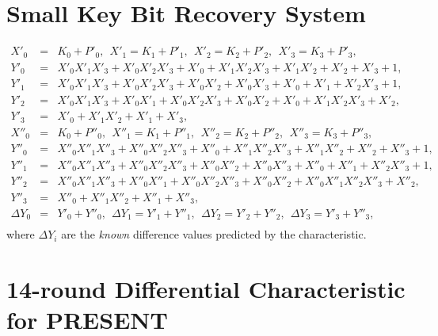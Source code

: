\documentclass{llncs}
\begin{document}
\section{Small Key Bit Recovery System}
\label{app:small-equ}
\begin{eqnarray*}
X'_0 &=& K_0 + P'_0, \ \ X'_1 = K_1 + P'_1, \ \ X'_2 = K_2 + P'_2, \ \ X'_3 =
K_3 +
P'_3,\\
Y'_0 &=& X'_0X'_1X'_3 + X'_0X'_2X'_3 + X'_0 + X'_1X'_2X'_3 + X'_1X'_2 +
X'_2 + X'_3 + 1,\\
Y'_1 &=& X'_0X'_1X'_3 + X'_0X'_2X'_3 + X'_0X'_2 + X'_0X'_3 + X'_0 + X'_1 +
X'_2X'_3 + 1,\\
Y'_2 &=& X'_0X'_1X'_3 + X'_0X'_1 + X'_0X'_2X'_3 + X'_0X'_2 + X'_0 +
X'_1X'_2X'_3 + X'_2,\\
Y'_3 &=& X'_0 + X'_1X'_2 + X'_1 + X'_3,\\
X''_0 &=& K_0 + P''_0,  \ \ X''_1 = K_1 + P''_1,  \ \ X''_2 = K_2 + P''_2,  \ \
X''_3 = K_3
+ P''_3,\\
Y''_0 &=& X''_0X''_1X''_3 + X''_0X''_2X''_3 + X''_0 + X''_1X''_2X''_3 +
X''_1X''_2 + X''_2 + X''_3 + 1,\\
Y''_1 &=& X''_0X''_1X''_3 + X''_0X''_2X''_3 + X''_0X''_2 + X''_0X''_3 +
X''_0 + X''_1 + X''_2X''_3 + 1,\\
Y''_2 &=& X''_0X''_1X''_3 + X''_0X''_1 + X''_0X''_2X''_3 + X''_0X''_2 +
X''_0  X''_1X''_2X''_3 + X''_2,\\
Y''_3 &=& X''_0 + X''_1X''_2 + X''_1 + X''_3,\\
\Delta Y_0 &=& Y'_0 + Y''_0,  \ \  \Delta Y_1 = Y'_1 + Y''_1,  \ \  \Delta Y_2 =
Y'_2 +
Y''_2,  \ \  \Delta Y_3 = Y'_3 + Y''_3,\\
\end{eqnarray*}
where $\Delta Y_i$ are the \emph{known} difference values predicted by the
characteristic.

\section{14-round Differential Characteristic for PRESENT}
\label{app:present-dc}
\end{document}

